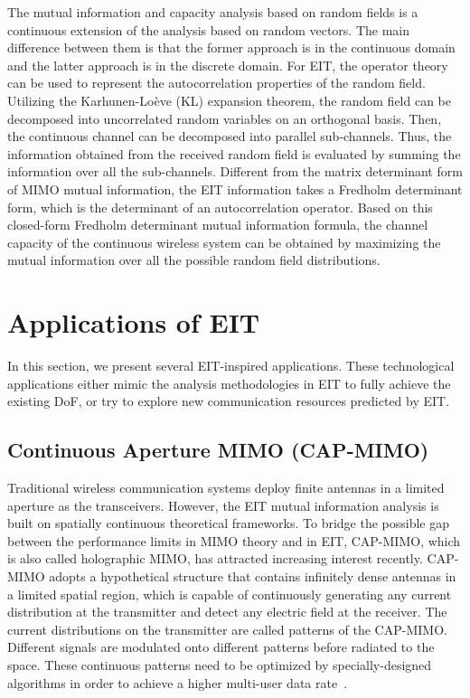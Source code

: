 \documentclass[journal,twocolumn]{IEEEtran}
\begin{document}
The mutual information and capacity analysis based on random fields is a continuous extension of the analysis based on random vectors. The main difference between them is that the former approach is in the continuous domain and the latter approach is in the discrete domain. For EIT, the operator theory can be used to represent the autocorrelation properties of the random field. 
Utilizing the Karhunen-Lo\`{e}ve (KL) expansion theorem, the random field can be decomposed into uncorrelated random variables on an orthogonal basis. Then, the continuous channel can be decomposed into parallel sub-channels. Thus, the information obtained from the received random field is evaluated by summing the information over all the sub-channels. 
Different from the matrix determinant form of MIMO mutual information, the EIT information takes a Fredholm determinant form, which is the determinant of an autocorrelation operator. Based on this closed-form Fredholm determinant mutual information formula, the channel capacity of the continuous wireless system can be obtained by maximizing the mutual information over all the possible random field distributions. 


\section{Applications of EIT}
In this section, we present several EIT-inspired applications. 
These technological applications either mimic the analysis methodologies in EIT to fully achieve the existing DoF, or try to explore new communication resources predicted by EIT. 

\subsection{Continuous Aperture MIMO (CAP-MIMO)}
Traditional wireless communication systems deploy finite antennas in a limited aperture as the transceivers. 
However, the EIT mutual information analysis is built on spatially continuous theoretical frameworks. 
To bridge the possible gap between the performance limits in MIMO theory and in EIT, CAP-MIMO, which is also called holographic MIMO, has attracted increasing interest recently. 
CAP-MIMO adopts a hypothetical structure that contains infinitely dense antennas in a limited spatial region, which is capable of continuously generating any current distribution at the transmitter and detect any electric field at the receiver.  
The current distributions on the transmitter are called patterns of the CAP-MIMO. 
Different signals are modulated onto different patterns before radiated to the space. 
These continuous patterns need to be optimized by specially-designed algorithms in order to achieve a higher multi-user data rate~\cite{zhang2022pdma}. 
\end{document}
